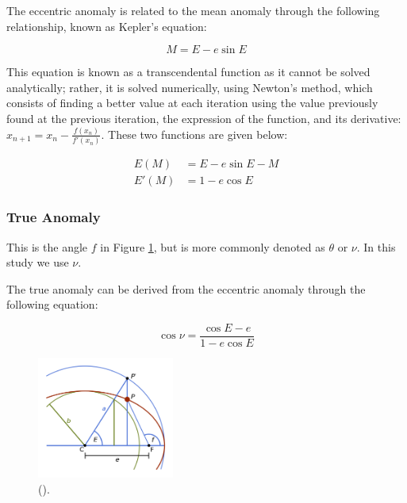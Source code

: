 \documentclass[11pt]{article}
\begin{document}
The eccentric anomaly is related to the mean anomaly through the
following relationship, known as Kepler's equation:

\begin{equation*}
M = E - e\sin{E} 
\end{equation*}

This equation is known as a transcendental function as it cannot be
solved analytically; rather, it is solved numerically, using Newton's method, which consists of finding a better value at each
iteration using the value previously found at the previous iteration,
the expression of the function, and its derivative:
\(x_{n+1} = x_{n}-\frac{f(x_{n})}{f'(x_{n})}\). These two functions are
given below:

\begin{align}
E(M)  & = E - e\sin{E} - M \\
E'(M) & = 1 - e\cos{E}
\end{align}

\vfill

\hypertarget{true-anomaly}{%
\subsubsection{True Anomaly}\label{true-anomaly}}

This is the angle \(f\) in Figure \ref{Figure 2.c}, but is more commonly denoted as
\(\theta\) or \(\nu\). In this study we use \(\nu\).

The true anomaly can be derived from the eccentric anomaly through the following equation:

\begin{equation*}
\cos{\nu} = \frac{ \cos{E} - e }{ 1 - e\cos{E} } 
\end{equation*}


\begin{figure}[!ht]
	\centering
	\includegraphics[width=0.4\textwidth]{../images/Eccentric_and_True_Anomaly.png}
	\caption{(\cite{Wikic}).} \label{Figure 2.c}
\end{figure}
\end{document}
